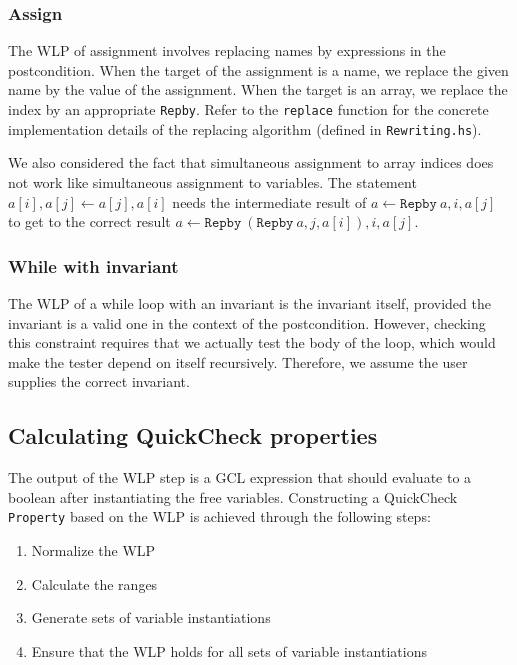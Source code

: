 \documentclass[a4paper]{article}
\begin{document}

\subsubsection*{Assign}

The WLP of assignment involves replacing names by expressions in the postcondition.
When the target of the assignment is a name, we replace the given name by the value
of the assignment. When the target is an array, we replace the index by an appropriate
\texttt{Repby}. Refer to the \texttt{replace} function for the concrete implementation
details of the replacing algorithm (defined in \texttt{Rewriting.hs}).

We also considered the fact that simultaneous assignment to array indices does
not work like simultaneous assignment to variables. The statement
$a[i], a[j] \gets a[j], a[i]$ needs the intermediate result of
$a \gets \texttt{Repby}\ a, i, a[j]$ to get to the correct result
$a \gets \texttt{Repby}\ (\texttt{Repby}\ a, j, a[i]), i, a[j]$.

\subsubsection*{While with invariant}

The WLP of a while loop with an invariant is the invariant itself, provided the
invariant is a valid one in the context of the postcondition. However, checking
this constraint requires that we actually test the body of the loop, which
would make the tester depend on itself recursively. Therefore, we assume the
user supplies the correct invariant.

\subsection{Calculating QuickCheck properties}

The output of the WLP step is a GCL expression that should evaluate to a boolean
after instantiating the free variables. Constructing a QuickCheck \texttt{Property}
based on the WLP is achieved through the following steps:

\begin{enumerate}
\item Normalize the WLP
\item Calculate the ranges
\item Generate sets of variable instantiations
\item Ensure that the WLP holds for all sets of variable instantiations
\end{enumerate}
\end{document}
